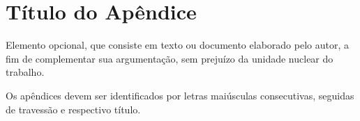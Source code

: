 \chapter{Título do Apêndice}

Elemento opcional, que consiste em texto ou documento elaborado pelo autor, a fim de complementar sua argumentação, sem prejuízo da unidade nuclear do trabalho.

Os apêndices devem ser identificados por letras maiúsculas consecutivas, seguidas de travessão e respectivo título.